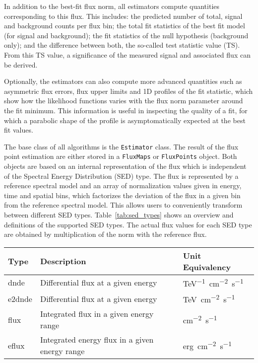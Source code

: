\documentclass[longauth]{aa}
\newcommand{\code}[1]{\texttt{#1}}
\newcommand{\gammapy}{Gammapy\xspace}
\begin{document}
In addition to the best-fit flux norm, all estimators compute
quantities corresponding to this flux. This includes:
the predicted number of total, signal and background
counts per flux bin; the total fit statistics
of the best fit model (for signal and background); the fit statistics of the
null hypothesis (background only); and the difference between both,
the so-called test statistic value (TS).
From this TS value, a significance of the measured signal and associated flux
can be derived.

Optionally, the estimators can also compute more advanced quantities
such as asymmetric flux errors, flux upper limits
and 1D profiles of the fit statistic,
which show how the likelihood functions varies with
the flux norm parameter around the fit minimum.
This information is useful in inspecting the quality
of a fit, for which a parabolic
shape of the profile is asymptomatically expected at the best fit
values.

The base class of all algorithms is the \code{Estimator}  class.
The result of the flux point estimation are either stored in a
\code{FluxMaps} or \code{FluxPoints} object. Both objects
are based on an internal representation of the flux which is
independent of the Spectral Energy Distribution (SED) type. The flux is represented
by a reference spectral model and an array of
normalization values given in energy, time and spatial bins,
which factorizes the deviation of the flux in a given
bin from the reference spectral model. This allows
users to conveniently transform between different
SED types. Table~\ref{tab:sed_types} shows an
overview and definitions of the supported SED types.
The actual flux values for each SED type are obtained
by multiplication of the {norm} with the reference flux.

\begin{table*}
    \begin{center}
        \begin{tabular}{lll}
         \hline
         Type & Description & Unit Equivalency \\
         \hline
         dnde & Differential flux at a given energy & \si{TeV^{-1}.cm^{-2}.s^{-1}} \\
         e2dnde & Differential flux at a given energy  & \si{TeV.cm^{-2}.s^{-1}} \\
         flux & Integrated flux in a given energy range & \si{cm^{-2}.s^{-1}} \\
         eflux & Integrated energy flux in a given energy range & \si{erg.cm^{-2}.s^{-1}}\\
         \hline
        \end{tabular}
    \end{center}
    \caption{Definition of the different SED types supported in \gammapy.}
    \label{tab:sed_types}
\end{table*}
\end{document}
